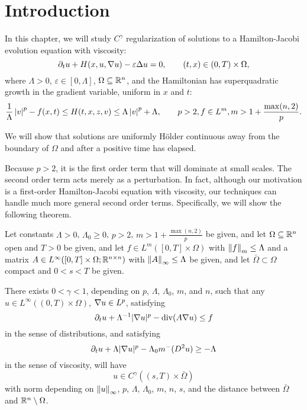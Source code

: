 %

\section{Introduction}
In this chapter, we will study $C^\gamma$ regularization of solutions to a Hamilton-Jacobi evolution equation with viscosity:
\[ \partial_t u + H(x,u,\nabla u) - \varepsilon \Delta u = 0, \qquad (t,x)\in (0,T)\times\Omega, \]
where $\Lambda > 0$, $\varepsilon \in [0,\Lambda]$, $\Omega \subseteq \mathbb{R}^n$, and the Hamiltonian has superquadratic growth in the gradient variable, uniform in $x$ and $t$:
\[ \frac{1}{\Lambda} \left\lvert v \right\rvert^p - f(x,t) \leq H(t,x,z,v) \leq \Lambda \left\lvert v \right\rvert^p + \Lambda, \qquad p>2, f \in L^m, m > 1+ \frac{\max(n,2)}{p}.\]

We will show that solutions are uniformly H\"{o}lder continuous away from the boundary of $\Omega$ and after a positive time has elapsed.  

Because $p>2$, it is the first order term that will dominate at small scales.  The second order term acts merely as a perturbation.  In fact, although our motivation is a first-order Hamilton-Jacobi equation with viscosity, our techniques can handle much more general second order terms.  Specifically, we will show the following theorem.  
%
\begin{theorem} \label{th:main}
Let constants $\Lambda > 0$, $\Lambda_0 \geq 0$, $p>2$, $m > 1+\frac{\max(n,2)}{p}$ be given, and let $\Omega \subseteq \mathbb{R}^n$ open and $T>0$ be given, and let $f \in L^m([0,T]\times \Omega)$ with $\left\lVert f\right\rVert_m \leq \Lambda$ and a matrix $A \in L^\infty([0,T]\times\Omega;\mathbb{R}^{n\times n})$ with $\left\lVert A\right\rVert_\infty \leq \Lambda$ be given, and let $\bar{\Omega} \subset \Omega$ compact and $0 < s < T$ be given.  

There exists $0<\gamma<1$, depending on $p$, $\Lambda$, $\Lambda_0$, $m$, and $n$, such that any $u \in L^\infty((0,T)\times\Omega)$, $\nabla u \in L^p$, satisfying 
\begin{equation} \label{eq:mainPDEdist}
\partial_t u + \Lambda^{-1} |\nabla u|^p - \operatorname{div} (A \nabla u) \leq f
\end{equation} 
in the sense of distributions, and satisfying 
\begin{equation} \label{eq:basePDEvisc}
\partial_t u + \Lambda |\nabla u|^p - \Lambda_0 m^-(D^2 u) \geq -\Lambda
\end{equation}
in the sense of viscosity, will have
\[ u \in C^\gamma((s,T)\times\bar{\Omega})\]
with norm depending on $\left\lVert u\right\rVert_\infty$, $p$, $\Lambda$, $\Lambda_0$, $m$, $n$, $s$, and the distance between $\bar{\Omega}$ and $\mathbb{R}^n \setminus \Omega$.  
\end{theorem}

